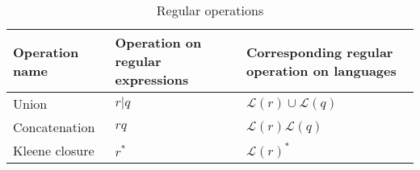 \begin{table}[t]
\centering


\begin{tabular}{@{}R L M@{}}
\toprule
Operation name & Operation on regular expressions & \quad Corresponding regular operation on languages \\ \midrule
Union          & \(r|q\) & \quad \(\mathcal{L}(r) \cup \mathcal{L}(q)\) \\
Concatenation  & \(rq\)  & \quad \(\mathcal{L}(r)\mathcal{L}(q)\) \\
Kleene closure & \(r^*\) & \quad \(\mathcal{L}(r)^*\)\\
\bottomrule
\end{tabular}
\caption{Regular operations}
\label{tab:regex-ops}
\end{table}
